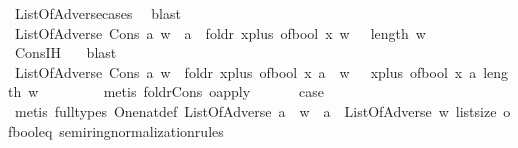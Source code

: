 \begin{isabellebody}
\ ListOfAdverse{\isachardot}cases\ \isamarkupfalse%
\ blast\isanewline
\ \ \ \ \isamarkupfalse%
\ \isamarkupfalse%
\ {\isachardoublequoteopen}ListOfAdverse\ {\isacharparenleft}Cons\ a\ w{\isacharparenright}\ {\isasymlongrightarrow}\ a\ {\isasymand}\ {\isacharparenleft}foldr\ {\isacharparenleft}{\isasymlambda}x{\isachardot}{\isacharparenleft}plus\ {\isacharparenleft}of{\isacharunderscore}bool\ x{\isacharparenright}{\isacharparenright}{\isacharparenright}\ w\ {}{\isacharparenright}\ {\isacharequal}\ length\ w{\isachardoublequoteclose}\isanewline
\ \ \ \ \ \ \isamarkupfalse%
\ Cons{\isachardot}IH\ \ \isamarkupfalse%
\ blast\isanewline
\ \ \ \ \isamarkupfalse%
\ \isamarkupfalse%
\ {\isachardoublequoteopen}ListOfAdverse\ {\isacharparenleft}Cons\ a\ w{\isacharparenright}\ {\isasymlongrightarrow}\ foldr\ {\isacharparenleft}{\isasymlambda}x{\isachardot}{\isacharparenleft}plus\ {\isacharparenleft}of{\isacharunderscore}bool\ x{\isacharparenright}{\isacharparenright}{\isacharparenright}\ {\isacharparenleft}a\ {\isacharhash}\ w{\isacharparenright}\ {}\ {\isacharequal}\ {\isacharparenleft}{\isasymlambda}x{\isachardot}{\isacharparenleft}plus\ {\isacharparenleft}of{\isacharunderscore}bool\ x{\isacharparenright}{\isacharparenright}{\isacharparenright}\ a\ {\isacharparenleft}length\ w{\isacharparenright}\ {\isachardoublequoteclose}\isanewline
\ \ \ \ \ \ \isamarkupfalse%
\ {\isacharparenleft}metis\ foldr{\isacharunderscore}Cons\ o{\isacharunderscore}apply{\isacharparenright}\ \isanewline
\ \ \isamarkupfalse%
\ \isamarkupfalse%
\ {\isacharquery}case\isanewline
\ \ \ \ \isamarkupfalse%
\ {\isacharparenleft}metis\ {\isacharparenleft}full{\isacharunderscore}types{\isacharparenright}\ One{\isacharunderscore}nat{\isacharunderscore}def\ {\isacartoucheopen}ListOfAdverse\ {\isacharparenleft}a\ {\isacharhash}\ w{\isacharparenright}\ {\isasymlongrightarrow}\ a\ {\isasymand}\ ListOfAdverse\ w{\isacartoucheclose}\ list{\isachardot}size{\isacharparenleft}{}{\isacharparenright}\ of{\isacharunderscore}bool{\isacharunderscore}eq{\isacharparenleft}{}{\isacharparenright}\ semiring{\isacharunderscore}normalization{\isacharunderscore}rules{\isacharparenleft}{}{}{\isacharparenright}{\isacharparenright}\ \isanewline
{}\isamarkupfalse%
%
\endisatagproof
{\isafoldproof}%
%
\isadelimproof
\isanewline
%
\endisadelimproof
\ \ \ \ \isanewline

\end{isabellebody}

